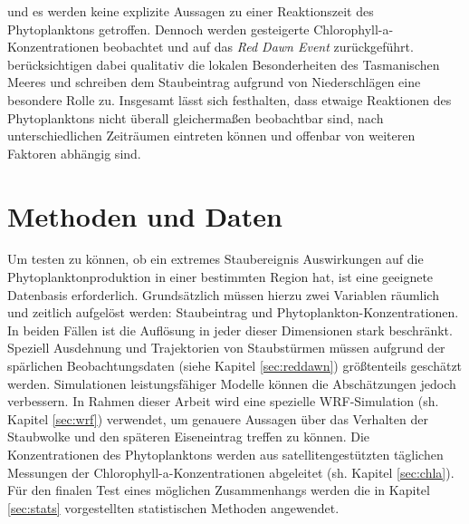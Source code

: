 \documentclass[12pt,a4paper,onecolumn,headheight=30pt]{scrartcl}
\begin{document}
und es werden keine explizite Aussagen zu einer Reaktionszeit des Phytoplanktons getroffen. Dennoch werden gesteigerte Chlorophyll-a-Konzentrationen beobachtet und auf das \textit{Red Dawn Event} zurückgeführt. \citet{Gabric.2016} berücksichtigen dabei qualitativ die lokalen Besonderheiten des Tasmanischen Meeres und schreiben dem Staubeintrag aufgrund von Niederschlägen eine besondere Rolle zu. Insgesamt lässt sich festhalten, dass etwaige Reaktionen des Phytoplanktons nicht überall gleichermaßen beobachtbar sind, nach unterschiedlichen Zeiträumen eintreten können und offenbar von  weiteren Faktoren abhängig sind. 
\section{Methoden und Daten} \label{sec:Methoden}
Um testen zu können, ob ein extremes Staubereignis Auswirkungen auf die Phytoplanktonproduktion in einer bestimmten Region hat, ist eine geeignete Datenbasis erforderlich. Grundsätzlich müssen hierzu zwei Variablen räumlich und zeitlich aufgelöst werden: Staubeintrag und Phytoplankton-Konzentrationen. In beiden Fällen ist die Auflösung in jeder dieser Dimensionen stark beschränkt. Speziell Ausdehnung und Trajektorien von Staubstürmen müssen aufgrund der spärlichen Beobachtungsdaten (siehe Kapitel  \ref{sec:reddawn}) größtenteils geschätzt werden. Simulationen leistungsfähiger Modelle können die Abschätzungen jedoch verbessern. In Rahmen dieser Arbeit wird eine spezielle WRF-Simulation (sh. Kapitel \ref{sec:wrf}) verwendet, um genauere Aussagen über das Verhalten der Staubwolke und den späteren Eiseneintrag treffen zu können. Die Konzentrationen des Phytoplanktons werden aus satellitengestützten täglichen Messungen der Chlorophyll-a-Konzentrationen abgeleitet (sh. Kapitel \ref{sec:chla}). Für den finalen Test eines möglichen Zusammenhangs werden die in Kapitel \ref{sec:stats} vorgestellten statistischen Methoden angewendet.
\end{document}
